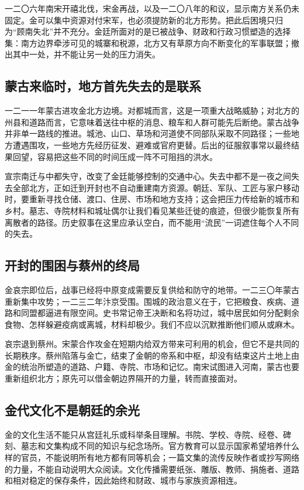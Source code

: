 一二〇六年南宋开禧北伐，宋金再战，以及一二〇八年的和议，显示南方关系仍未固定。金可以集中资源对付宋军，也必须提防新的北方形势。把此后困境只归为“顾南失北”并不充分。金廷所面对的是已被战争、财政和行政习惯塑造的选择集：南方边界牵涉可见的城寨和税源，北方又有草原方向不断变化的军事联盟；撤出其中一处，并不能让另一处的压力消失。

\subsection{蒙古来临时，地方首先失去的是联系}

一二一一年蒙古进攻金北方边境。对都城而言，这是一项重大战略威胁；对北方的州县和道路而言，它意味着送往中枢的消息、粮车和人群可能先后断绝。蒙古战争并非单一路线的推进。城池、山口、草场和河道使不同部队采取不同路径；一些地方遭遇围攻，一些地方先经历征发、避难或官府更替。后出的征服叙事常以最终结果回望，容易把这些不同的时间压成一阵不可阻挡的洪水。

宣宗南迁与中都失守，改变了金廷能够控制的交通中心。失去中都不是一夜之间失去全部北方，正如迁到开封也不自动重建南方资源。朝廷、军队、工匠与家户移动时，要重新寻找仓储、渡口、住房、市场和地方支持；这会把压力传给新的城市和乡村。墓志、寺院材料和城址偶尔让我们看见某些迁徙的痕迹，但很少能恢复所有离散者的路径。历史叙事在这里应承认空白，而不能用“流民”一词遮住每个人不同的失去。

\subsection{开封的围困与蔡州的终局}

金哀宗即位后，战事已经将中原变成需要反复供给和防守的地带。一二三〇年蒙古重新集中攻势；一二三二年汴京受围。围城的政治意义在于，它把粮食、疾病、道路和同盟都逼进有限空间。史书常记帝王决断和名将功过，城中居民如何分配剩余食物、怎样躲避疫病或离城，材料却极少。我们不应以沉默推断他们顺从或麻木。

哀宗退到蔡州。宋蒙合作攻金在短期内给双方带来可利用的机会，但它不是共同的长期秩序。蔡州陷落与金亡，结束了金朝的帝系和中枢，却没有结束这片土地上由金的统治所塑造的道路、户籍、寺院、市场和记忆。南宋试图进入河南，蒙古也要重新组织北方；原先可以借金朝边界隔开的力量，转而直接面对。

\subsection{金代文化不是朝廷的余光}

金的文化生活不能只从宫廷礼乐或科举条目理解。书院、学校、寺院、经卷、碑刻、墓志和文集构成不同的知识与纪念场所。官方教育可以显示国家希望培养什么样的官员，不能说明所有地方都有同等机会；一篇文集的流传反映作者或抄写网络的力量，不能自动说明大众阅读。文化传播需要纸张、雕版、教师、捐施者、道路和相对稳定的保存条件，因此始终和财政、城市与家族资源相连。

